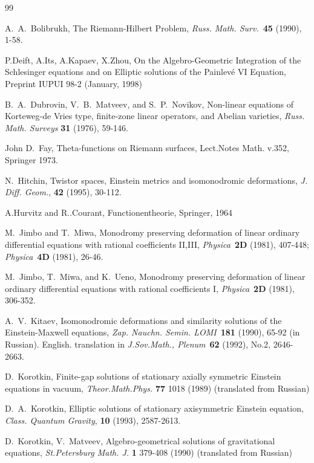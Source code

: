 \documentclass[11pt]{article}
\begin{document}
%
\begin{thebibliography}{99}

A.~A.~Bolibrukh,
The Riemann-Hilbert Problem,
{\it Russ. Math. Surv.}~{\bf 45} (1990), 1-58.

 P.Deift, A.Its, A.Kapaev, X.Zhou, On the Algebro-Geometric Integration of the Schlesinger
equations and on Elliptic solutions of the Painlev\'e VI Equation, Preprint IUPUI 98-2 (January, 1998) 

B.~A.~Dubrovin, V.~B.~Matveev, and S.~P.~Novikov,
Non-linear equations of Korteweg-de Vries type, finite-zone linear
operators, and Abelian varieties,
{\it Russ. Math. Surveys} {\bf 31} (1976), 59-146.

John D.~Fay,
Theta-functions on Riemann surfaces, Lect.Notes Math. v.352, Springer 1973.

N.~Hitchin, 
Twistor spaces, Einstein metrics and isomonodromic deformations,
{\it J. Diff. Geom.}, {\bf 42} (1995), 30-112.

A.Hurvitz and R..Courant, Functionentheorie, Springer, 1964

M.~Jimbo and T.~Miwa,
Monodromy preserving deformation of linear ordinary
differential equations with rational coefficients II,III,
{\it Physica}~{\bf 2D} (1981), 407-448;
{\it Physica}~{\bf 4D} (1981), 26-46.

M.~Jimbo, T.~Miwa, and K.~Ueno,
Monodromy preserving deformation of linear ordinary
differential equations with rational coefficients I,
{\it Physica}~{\bf 2D} (1981), 306-352.

A.~V.~Kitaev,
Isomonodromic deformations and similarity solutions of the Einstein-Maxwell 
equations,
{\it Zap. Nauchn. Semin. LOMI}~{\bf 181} (1990), 65-92 (in Russian).  
English. translation in {\it J.Sov.Math., Plenum}~{\bf 62} (1992), No.2,
2646-2663. 

 D.~Korotkin, Finite-gap solutions of stationary axially symmetric Einstein equations in vacuum, {\it Theor.Math.Phys.} {\bf 77} 1018 (1989)
(translated from Russian)

D.~A.~Korotkin,
Elliptic solutions of stationary axisymmetric Einstein equation,
{\it Class. Quantum Gravity}, {\bf 10} (1993), 2587-2613. 

 D.~Korotkin, V.~Matveev, Algebro-geometrical solutions of gravitational
equations, {\it St.Petersburg Math. J.} {\bf 1} 379-408 (1990)
(translated from Russian)


\end{thebibliography}
\end{document}

